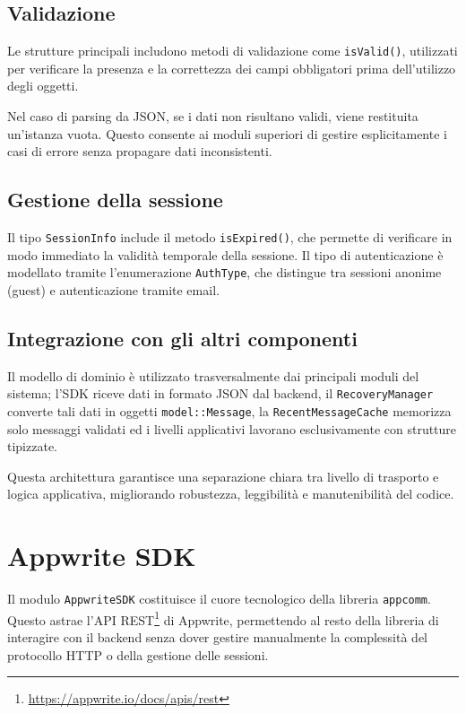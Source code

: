 \documentclass[a4paper, 11pt, twoside]{report}
\begin{document}
\subsection{Validazione}

Le strutture principali includono metodi di validazione come \texttt{isValid()}, utilizzati per verificare la presenza
e la correttezza dei campi obbligatori prima dell'utilizzo degli oggetti.

Nel caso di parsing da JSON, se i dati non risultano validi, viene restituita un'istanza vuota. Questo consente ai
moduli superiori di gestire esplicitamente i casi di errore senza propagare dati inconsistenti.

\subsection{Gestione della sessione}

Il tipo \texttt{SessionInfo} include il metodo \texttt{isExpired()}, che permette di verificare in modo immediato la
validità temporale della sessione. Il tipo di autenticazione è modellato tramite l'enumerazione \texttt{AuthType}, che
distingue tra sessioni anonime (guest) e autenticazione tramite email.

\subsection{Integrazione con gli altri componenti}

Il modello di dominio è utilizzato trasversalmente dai principali moduli del sistema; l'\gls{SDK} riceve dati in formato JSON 
dal backend, il \texttt{RecoveryManager} converte tali dati in oggetti \texttt{model::Message}, la 
\texttt{RecentMessageCache} memorizza solo messaggi validati ed i livelli applicativi lavorano esclusivamente con 
strutture tipizzate.

Questa architettura garantisce una separazione chiara tra livello di trasporto e logica applicativa, migliorando
robustezza, leggibilità e manutenibilità del codice.

\section{Appwrite \gls{SDK}}

Il modulo \texttt{AppwriteSDK} costituisce il cuore tecnologico della libreria \texttt{appcomm}. Questo astrae l'API
\gls{REST}\footnote{\url{https://appwrite.io/docs/apis/rest}} di Appwrite, permettendo al resto della libreria di interagire
con il backend senza dover gestire manualmente la complessità del protocollo \gls{HTTP} o della gestione delle sessioni.
\end{document}
